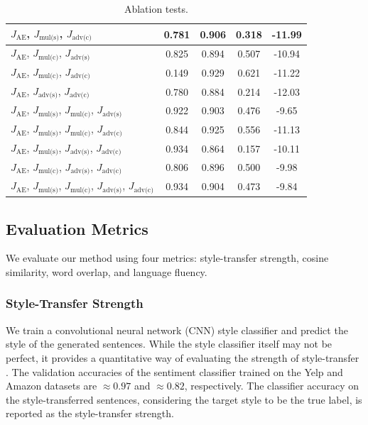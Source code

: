 \documentclass[letterpaper]{article} %
\newcommand{\loss}[1]{J_{\text{#1}}}
\begin{document}
\begin{table}[ht]
\begin{tabular}{| l || c | c | c | c |}
		\hline
		$\loss{AE}$, $\loss{mul(s)}$, $\loss{adv(c)}$                                   & 0.781           & 0.906             & 0.318          & -11.99          \\
		\hline
		$\loss{AE}$, $\loss{mul(c)}$, $\loss{adv(s)}$                                   & 0.825           & 0.894             & 0.507          & -10.94          \\
		\hline
		$\loss{AE}$, $\loss{mul(c)}$, $\loss{adv(c)}$                                   & 0.149           & 0.929             & 0.621          & -11.22          \\
		\hline
		$\loss{AE}$, $\loss{adv(s)}$, $\loss{adv(c)}$                                   & 0.780           & 0.884             & 0.214          & -12.03          \\
		\hline
		$\loss{AE}$, $\loss{mul(s)}$, $\loss{mul(c)}$, $\loss{adv(s)}$                  & 0.922           & 0.903             & 0.476          & -9.65           \\
		\hline
		$\loss{AE}$, $\loss{mul(s)}$, $\loss{mul(c)}$, $\loss{adv(c)}$                  & 0.844           & 0.925             & 0.556          & -11.13          \\
		\hline
		$\loss{AE}$, $\loss{mul(s)}$, $\loss{adv(s)}$, $\loss{adv(c)}$                  & 0.934           & 0.864             & 0.157          & -10.11          \\
		\hline
		$\loss{AE}$, $\loss{mul(c)}$, $\loss{adv(s)}$, $\loss{adv(c)}$                  & 0.806           & 0.896             & 0.500          & -9.98           \\
		\hline
		$\loss{AE}$, $\loss{mul(s)}$, $\loss{mul(c)}$, $\loss{adv(s)}$, $\loss{adv(c)}$ & 0.934           & 0.904             & 0.473          & -9.84           \\
		\hline
	\end{tabular}
	\caption{Ablation tests.}
	\label{tab:ablation-results}
\end{table}

\subsection{Evaluation Metrics}

We evaluate our method using four metrics: style-transfer strength, cosine similarity, word overlap, and language fluency.

\subsubsection{Style-Transfer Strength}
We train a convolutional neural network (CNN) style classifier \cite{kim2014convolutional} and predict the style of the generated sentences.
While the style classifier itself may not be perfect, it provides a quantitative way of evaluating the strength of style-transfer \cite{hu2017toward,shen2017style,fu2017style}.
The validation accuracies of the sentiment classifier trained on the Yelp and Amazon datasets are $\approx 0.97$ and $\approx 0.82$, respectively.
The classifier accuracy on the style-transferred sentences, considering the target style to be the true label, is reported as the style-transfer strength.
\end{document}
